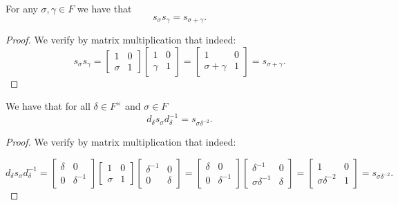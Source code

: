 \begin{lemma}
\label{SpecialMatrices.s_mul_s_eq_s_add}
\leanok
    For any $\sigma, \gamma \in F$ we have that
    \[
    s_\sigma s_\gamma = s_{\sigma + \gamma}.
    \]
\end{lemma}
\begin{proof}
    We verify by matrix multiplication that indeed:
\begin{equation*}
    s_\sigma s_\gamma = \begin{bmatrix} 1 & 0 \\ \sigma & 1 \end{bmatrix} \begin{bmatrix} 1 & 0 \\ \gamma & 1 \end{bmatrix} = \begin{bmatrix} 1 & 0 \\ \sigma + \gamma & 1 \end{bmatrix} = s_{\sigma + \gamma}.
\end{equation*}
\end{proof}

\begin{lemma}
\label{SpecialMatrices.d_mul_s_mul_d_inv_eq_s}
\leanok
    We have that for all $\delta \in F^\times$ and $\sigma \in F$
    \[
    d_\delta s_\sigma d^{-1}_\delta = s_{\sigma \delta^{-2}}.
    \]
\end{lemma}

\begin{proof}
    We verify by matrix multiplication that indeed:

    \begin{equation*}
        d_\delta s_\sigma d^{-1}_\delta = \! \begin{bmatrix} \delta & 0 \\ 0 & \delta^{-1} \end{bmatrix} \begin{bmatrix} 1 & 0 \\ \sigma & 1 \end{bmatrix} \begin{bmatrix} \delta^{-1} & 0 \\ 0 & \delta \end{bmatrix} = \begin{bmatrix} \delta & 0 \\ 0 & \delta^{-1} \end{bmatrix} \! \begin{bmatrix} \delta^{-1} & 0 \\ \sigma \delta^{-1} & \delta \end{bmatrix} \! = \! \begin{bmatrix} 1 & 0 \\ \sigma \delta^{-2} & 1 \end{bmatrix} \! = s_{\sigma \delta^{-2}}.
    \end{equation*}
\end{proof}



